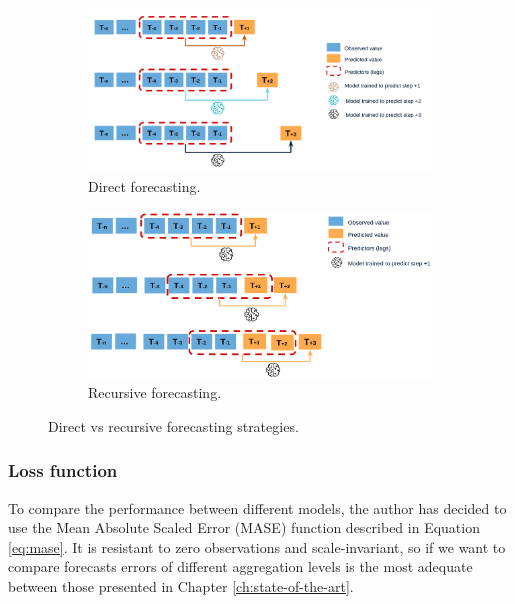 \begin{figure}[H]
\centering
    \begin{subfigure}{.45\textwidth}
        \centering
        \includegraphics[width=1\linewidth]{images/methodology/direct-multi-step-forecasting}
        \caption{Direct forecasting.}
    \end{subfigure}
    \begin{subfigure}{.45\textwidth}
        \centering
        \includegraphics[width=1\linewidth]{images/methodology/recursive-mutistep-forecasting}
        \caption{Recursive forecasting.}
    \end{subfigure}

    \caption{Direct vs recursive forecasting strategies.}
    \label{fig:direct-recursive-forecasting}
\end{figure}

\subsubsection{Loss function}
To compare the performance between different models, the author has decided to use the Mean Absolute Scaled Error (MASE) function described in Equation \ref{eq:mase}. It is resistant to zero observations and scale-invariant, so if we want to compare forecasts errors of different aggregation levels is the most adequate between those presented in Chapter \ref{ch:state-of-the-art}.

